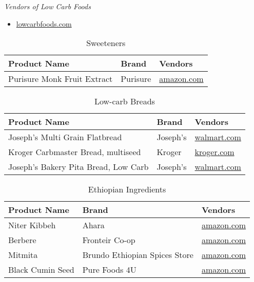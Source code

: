 \documentclass[../recipe-collections/cooking.tex]{subfiles}
\begin{document}
\textit{Vendors of Low Carb Foods} \\
\begin{itemize}
    \item \href{https://www.lowcarbfoods.com/}{lowcarbfoods.com}
\end{itemize}

\begin{table}[H]
    \begin{tabularx}{\textwidth}{|X|X|X|}
    \hline
    \textbf{Product Name} & \textbf{Brand} & \textbf{Vendors} \\ \hline \hline
    Purisure Monk Fruit Extract & Purisure & \href{https://www.amazon.com/gp/product/B07PMLB7SP/}{amazon.com} \\ \hline
    \end{tabularx}
    \caption{Sweeteners}
    \label{tab:sweeteners}
\end{table}

\begin{table}[H]
    \begin{tabularx}{\textwidth}{|X|X|X|}
    \hline
    \textbf{Product Name} & \textbf{Brand} & \textbf{Vendors} \\ \hline \hline
    Joseph's Multi Grain Flatbread & Joseph's & \href{https://www.walmart.com/ip/Joseph-s-Multi-Grain-Flatbread-5-ct-10-oz/189039790}{walmart.com} \\ \hline
    Kroger Carbmaster Bread, multiseed & Kroger & \href{https://www.kroger.com/p/kroger-carbmaster-multi-seed-bread/0001111009054}{kroger.com} \\ \hline
    Joseph's Bakery Pita Bread, Low Carb & Joseph's & \href{https://www.walmart.com/ip/Joseph-s-Bakery-Pita-Bread-Low-Carb-8-oz/944114225}{walmart.com} \\ \hline
    \end{tabularx}
    \caption{Low-carb Breads}
    \label{tab:breads}
\end{table}

\begin{table}[H]
    \begin{tabularx}{\textwidth}{|X|X|X|}
    \hline
    \textbf{Product Name} & \textbf{Brand} & \textbf{Vendors} \\ \hline \hline
    Niter Kibbeh & Ahara & \href{https://www.amazon.com/dp/B08SBTVR21}{amazon.com} \\ \hline
    Berbere & Fronteir Co-op & \href{https://www.amazon.com/dp/B00269PJZY}{amazon.com} \\ \hline
    Mitmita & Brundo Ethiopian Spices Store & \href{https://www.amazon.com/dp/B00ACO1VLG}{amazon.com} \\ \hline
    Black Cumin Seed & Pure Foods 4U & \href{https://www.amazon.com/dp/B08NWZ41QL}{amazon.com} \\ \hline    
    \end{tabularx}
    \caption{Ethiopian Ingredients}
    \label{tab:ethiopian-ingredients}
\end{table}
\end{document}
